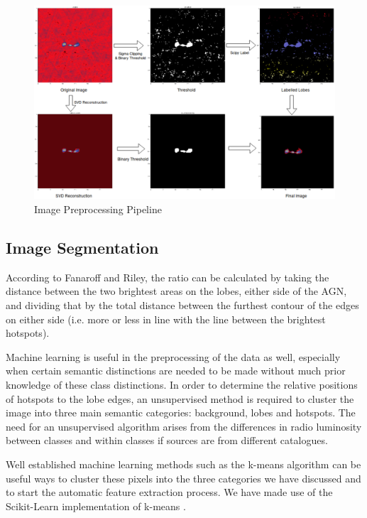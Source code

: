 \documentclass[conference]{IEEEtran}
\begin{document}
\begin{figure}[h]
    \centering
    \includegraphics[scale=0.5]{EPS/pipelines.eps}
    \caption{Image Preprocessing Pipeline}
    \label{fig:imagepipeline}
\end{figure}

\subsection{Image Segmentation}
According to Fanaroff and Riley, the ratio can be calculated by taking the distance between the two brightest areas on the lobes, either side of the AGN, and dividing that by the total distance between the furthest contour of the edges on either side (i.e. more or less in line with the line between the brightest hotspots).

Machine learning is useful in the preprocessing of the data as well, especially when certain semantic distinctions are needed to be made without much prior knowledge of these class distinctions. In order to determine the relative positions of hotspots to the lobe edges, an unsupervised method is required to cluster the image into three main semantic categories: background, lobes and hotspots. The need for an unsupervised algorithm arises from the differences in radio luminosity between classes and within classes if sources are from different catalogues.
 
Well established machine learning methods such as the k-means 
algorithm \cite{macqueen1967} can be useful ways to 
cluster these pixels into the three categories we have discussed and to start the automatic feature extraction process. We have made use of the Scikit-Learn implementation of k-means \cite{scikit-learn}. 
\end{document}
